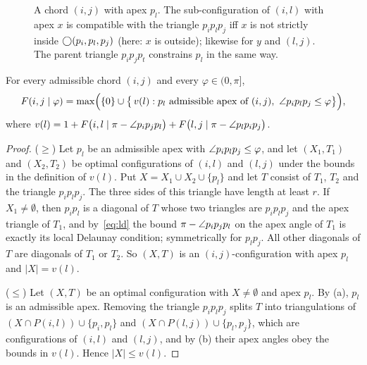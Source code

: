 \begin{figure}[tb]
\centering
{}
\caption{A chord $(i,j)$ with apex $p_l$. The sub-configuration of $(i,l)$
with apex $x$ is compatible with the triangle $p_ip_lp_j$ iff $x$ is not
strictly inside $\bigcirc(p_i,p_l,p_j)$ (here: $x$ is outside); likewise
for $y$ and $(l,j)$. The parent triangle $p_ip_jp_t$ constrains $p_l$ in the
same way.}
\label{fig:dp}
\end{figure}

\begin{lemma}[Recurrence]\label{lem:rec}
For every admissible chord $(i,j)$ and every $\varphi\in(0,\pi]$,
\[
F(i,j\mid\varphi)=\max\Bigl(\{0\}\cup\bigl\{\,v(l) : p_l\text{ admissible apex of }(i,j),\ \angle p_ip_lp_j\le\varphi\bigr\}\Bigr),
\]
where
$v(l)=1+F\bigl(i,l\mid\pi-\angle p_ip_jp_l\bigr)+F\bigl(l,j\mid\pi-\angle p_lp_ip_j\bigr)$.
\end{lemma}
\begin{proof}
($\ge$) Let $p_l$ be an admissible apex with $\angle p_ip_lp_j\le\varphi$, and
let $(X_1,T_1)$ and $(X_2,T_2)$ be optimal configurations of $(i,l)$ and
$(l,j)$ under the bounds in the definition of $v(l)$. Put
$X=X_1\cup X_2\cup\{p_l\}$ and let $T$ consist of $T_1$, $T_2$ and the
triangle $p_ip_lp_j$. The three sides of this triangle have length at least
$r$. If $X_1\ne\emptyset$, then $p_ip_l$ is a diagonal of $T$ whose two
triangles are $p_ip_lp_j$ and the apex triangle of $T_1$, and
by~\eqref{eq:ld} the bound $\pi-\angle p_ip_jp_l$ on the apex angle of $T_1$ is
exactly its local Delaunay condition; symmetrically for $p_lp_j$. All other
diagonals of $T$ are diagonals of $T_1$ or $T_2$. So $(X,T)$ is an
$(i,j)$-configuration with apex $p_l$ and $|X|=v(l)$.

($\le$) Let $(X,T)$ be an optimal configuration with $X\ne\emptyset$ and apex
$p_l$. By (a), $p_l$ is an admissible apex. Removing the triangle $p_ip_lp_j$
splits $T$ into triangulations of $(X\cap P(i,l))\cup\{p_i,p_l\}$ and
$(X\cap P(l,j))\cup\{p_l,p_j\}$, which are configurations of $(i,l)$ and
$(l,j)$, and by (b) their apex angles obey the bounds in $v(l)$. Hence
$|X|\le v(l)$.
\end{proof}

